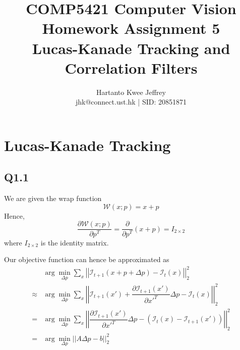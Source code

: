 \documentclass{article} %
\title{\large COMP5421 Computer Vision
\\ \huge Homework Assignment 5
\\ \huge Lucas-Kanade Tracking and Correlation Filters}
\author{Hartanto Kwee Jeffrey\\
    \normalsize jhk@connect.ust.hk | SID: 20851871} %
\date{}
\begin{document}
    \maketitle %
    
    \section[1]{Lucas-Kanade Tracking} %

    \subsection*{Q1.1}

    We are given the wrap function
    \begin{equation*}
    \mathcal{W}\left(x;p\right)=x+p
    \end{equation*}
    Hence,
    \begin{equation*}
    \frac{\partial \mathcal{W}(x;p)}{\partial p^{T}}=\frac{\partial }{\partial p^{T}}\left(x+p\right)=I_{2\times 2}
    \end{equation*}
    where $I_{2\times 2}$ is the identity matrix.
    \medskip

    Our objective function can hence be approximated as
    \begin{align*}
    &\arg \min _{\Delta p} \sum _{x}{\left| \left| \mathcal{I}_{t+1}\left(x+p+\Delta p\right)-\mathcal{I}_{t}\left(x\right)\right| \right| }_{2}^{2} \\
    \approx&\arg \min _{\Delta p} \sum _{x}{\left| \left| \mathcal{I}_{t+1}\left(x'\right)+\dfrac{\partial \mathcal{I}_{t+1}\left(x'\right)}{\partial x'^{T}}\Delta p-\mathcal{I}_{t}\left(x\right)\right| \right| }_{2}^{2}\\ 
    =&\arg \min _{\Delta p} \sum _{x}{\left| \left| \dfrac{\partial \mathcal{I}_{t+1}\left(x'\right)}{\partial x'^{T}}\Delta p-\left(\mathcal{I}_{t}\left(x\right)-\mathcal{I}_{t+1}\left(x'\right)\right)\right| \right| }_{2}^{2}\\ 
    =&\arg \min _{\Delta p} {\left| \left| A\Delta p-b\right| \right| }_{2}^{2}
    \end{align*}
\end{document}

